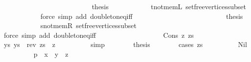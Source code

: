 \begin{isabellebody}
\ \ \ \ \ \ \isamarkupfalse%
\isanewline
\ \ \ \ \ \ \ \ \isamarkupfalse%
\ {}\isanewline
\ \ \ \ \ \ \ \ \isamarkupfalse%
\ {\isacharquery}{\kern0pt}thesis\isanewline
\ \ \ \ \ \ \ \ \ \ \isamarkupfalse%
\ t{\isacharunderscore}{\kern0pt}not{\isacharunderscore}{\kern0pt}mem{\isacharunderscore}{\kern0pt}L\ set{\isacharunderscore}{\kern0pt}free{\isacharunderscore}{\kern0pt}vertices{\isacharunderscore}{\kern0pt}subset\isanewline
\ \ \ \ \ \ \ \ \ \ \isamarkupfalse%
\ {\isacharparenleft}{\kern0pt}force\ simp\ add{\isacharcolon}{\kern0pt}\ doubleton{\isacharunderscore}{\kern0pt}eq{\isacharunderscore}{\kern0pt}iff{\isacharparenright}{\kern0pt}\isanewline
\ \ \ \ \ \ \isamarkupfalse%
\isanewline
\ \ \ \ \ \ \ \ \isamarkupfalse%
\ {}\isanewline
\ \ \ \ \ \ \ \ \isamarkupfalse%
\ {\isacharquery}{\kern0pt}thesis\isanewline
\ \ \ \ \ \ \ \ \ \ \isamarkupfalse%
\ s{\isacharunderscore}{\kern0pt}not{\isacharunderscore}{\kern0pt}mem{\isacharunderscore}{\kern0pt}R\ set{\isacharunderscore}{\kern0pt}free{\isacharunderscore}{\kern0pt}vertices{\isacharunderscore}{\kern0pt}subset\isanewline
\ \ \ \ \ \ \ \ \ \ \isamarkupfalse%
\ {\isacharparenleft}{\kern0pt}force\ simp\ add{\isacharcolon}{\kern0pt}\ doubleton{\isacharunderscore}{\kern0pt}eq{\isacharunderscore}{\kern0pt}iff{\isacharparenright}{\kern0pt}\isanewline
\ \ \ \ \ \ \isamarkupfalse%
\isanewline
\ \ \ \ \isamarkupfalse%
\isanewline
\ \ \ \ \ \ \isamarkupfalse%
\ {\isacharparenleft}{\kern0pt}Cons\ z\ zs{\isacharparenright}{\kern0pt}\isanewline
\ \ \ \ \ \ \isamarkupfalse%
\ ys{\isacharcolon}{\kern0pt}\ {\isachardoublequoteopen}ys\ {\isacharequal}{\kern0pt}\ rev\ zs\ {\isacharat}{\kern0pt}\ {\isacharbrackleft}{\kern0pt}z{\isacharbrackright}{\kern0pt}{\isachardoublequoteclose}\isanewline
\ \ \ \ \ \ \ \ \isamarkupfalse%
\ simp\isanewline
\ \ \ \ \ \ \isamarkupfalse%
\ {\isacharquery}{\kern0pt}thesis\isanewline
\ \ \ \ \ \ \isamarkupfalse%
\ {\isacharparenleft}{\kern0pt}cases\ zs{\isacharparenright}{\kern0pt}\isanewline
\ \ \ \ \ \ \ \ \isamarkupfalse%
\ Nil\isanewline
\ \ \ \ \ \ \ \ \isamarkupfalse%
\ {\isachardoublequoteopen}{\isacharquery}{\kern0pt}p\ {\isacharequal}{\kern0pt}\ x\ {\isacharhash}{\kern0pt}\ y\ {\isacharhash}{\kern0pt}\ {\isacharbrackleft}{\kern0pt}z{\isacharbrackright}{\kern0pt}{\isachardoublequoteclose}\isanewline

\end{isabellebody}
